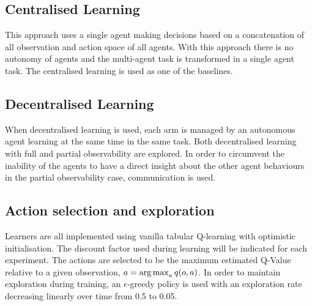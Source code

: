 \subsection*{Centralised Learning}

This approach uses a single agent making decisions based on a concatenation of all observation and action space of all agents. With this approach there is no autonomy of agents and the multi-agent task is transformed in a single agent task. The centralised learning is used as one of the baselines.

\subsection*{Decentralised Learning}

When decentralised learning is used, each arm is managed by an autonomous agent learning at the same time in the same task. Both decentralised learning with full and partial observability are explored. In order to circumvent the inability of the agents to have a direct insight about the other agent behaviours in the partial observability case, communication is used.

\subsection{Action selection and exploration}

Learners are all implemented using vanilla tabular Q-learning with optimistic initialisation. The discount factor used during learning will be indicated for each experiment. The actions are selected to be the maximum estimated Q-Value relative to a given observation, $a = \operatorname*{arg\,max}_a q(o, a)$. In order to maintain exploration during training, an $\epsilon$-greedy policy is used with an exploration rate decreasing linearly over time from 0.5 to 0.05.
























